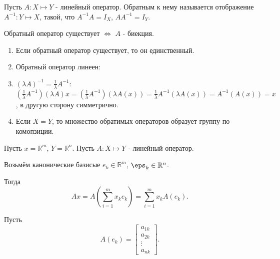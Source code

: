 \begin{definition} \thmslashn 

    Пусть $A: X \mapsto Y$ - линейный оператор. Обратным к нему называется отображение $A^{-1} : Y \mapsto X$, такой, что $A^{-1}A = I_{X}$, $A A^{-1} = I_{Y}$. 
\end{definition}
\begin{consequence} \thmslashn

    Обратный оператор существует $\iff$ $A$ - биекция.
\end{consequence}
\begin{properties} \thmslashn

    \begin{enumerate}
        \item Если обратный оператор существует, то он единственный.
        \item Обратный оператор линеен: \TODO
        \item $(\lambda A)^{-1} = \frac{1}{\lambda} A^{-1}$: $\left( \frac{1}{\lambda} A^{-1}\right)\left( \lambda A \right)x = \left( \frac{1}{\lambda} A^{-1}\right)(\lambda A(x)) = \frac{1}{\lambda} A^{-1}(\lambda A(x)) = A^{-1}(A(x)) = x   $, в другую сторону симметрично.
        \item Если $X = Y$, то множество обратимых операторов образует группу по комопзиции.
    \end{enumerate}
\end{properties}
Пусть $x = \mathbb{R}^{m}$, $Y = \mathbb{R}^{n}$. Пусть $A : X \mapsto Y$ - линейный оператор.

Возьмём канонические базисые $e_{k}\in \mathbb{R}^{m}$, $\eps_{k}\in \mathbb{R}^{n}$.

Тогда
\[ Ax = A\left(\sum\limits_{i=1}^{m} x_{k}e_{k} \right) = \sum\limits_{i=1}^{m} x_{k}A(e_{k})  .\]

Пусть
\[ A(e_{k}) = \begin{bmatrix} a_{1k}\\ a_{2k}\\ \vdots\\ a_{nk} \end{bmatrix}  .\]

